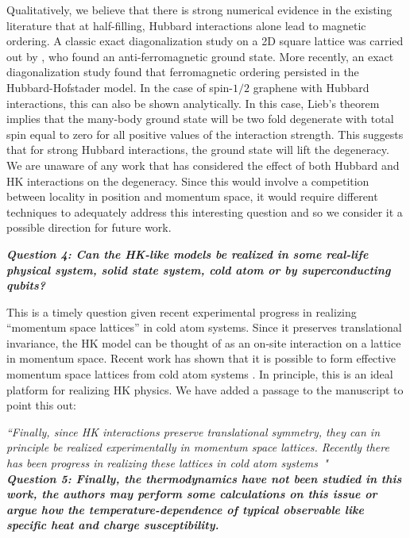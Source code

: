 \documentclass[aps,reprint,notitlepage,onecolumn,12pt]{revtex4-2}
\numberwithin{equation}{section}
\begin{document}
Qualitatively, we believe that there is strong numerical evidence in the existing literature that at half-filling, Hubbard interactions alone lead to magnetic ordering. 
A classic exact diagonalization study on a 2D square lattice was carried out by \cite{White2dhubbardnumerics89}, who found an anti-ferromagnetic ground state. More recently, an exact diagonalization study \cite{mai2023topological} found that ferromagnetic ordering persisted in the Hubbard-Hofstader model. 
In the case of spin-$1/2$ graphene with Hubbard interactions, this can also be shown analytically. 
In this case, Lieb's theorem implies \cite{Liebtheorem89} that the many-body ground state will be two fold degenerate with total spin equal to zero for all positive values of the interaction strength. 
This suggests that for strong Hubbard interactions, the ground state will lift the degeneracy.\\

\indent We are unaware of any work that has considered the effect of both Hubbard and HK interactions on the degeneracy. 
Since this would involve a competition between locality in position and momentum space, it would require different techniques to adequately address this interesting question and so we consider it a possible direction for future work.


\textbf{\textit{Question 4: Can the HK-like models be realized in some real-life physical
system, solid state system, cold atom or by superconducting qubits?}}

This is a timely question given recent experimental progress in realizing ``momentum space lattices'' in cold atom systems. Since it preserves translational invariance, the HK model can be thought of as an on-site interaction on a lattice in momentum space. Recent work has shown that it is possible to form effective momentum space lattices from cold atom systems \cite{gadwaymsl21}. In principle, this is an ideal platform for realizing HK physics. We have added a passage to the manuscript to point this out:

\textit{``Finally, since HK interactions preserve translational symmetry, they can in principle be realized experimentally in momentum space lattices. Recently there has been progress in realizing these lattices in cold atom systems~\cite{gadwaymsl21}"}\\


\textbf{\textit{Question 5: Finally, the thermodynamics have not been studied in this work, the authors may perform some calculations on this issue or argue how the temperature-dependence of typical observable like specific heat and charge susceptibility.}}\\
\end{document}
